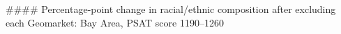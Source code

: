 #### Percentage-point change in racial/ethnic composition after excluding each Geomarket: Bay Area, PSAT score 1190–1260

